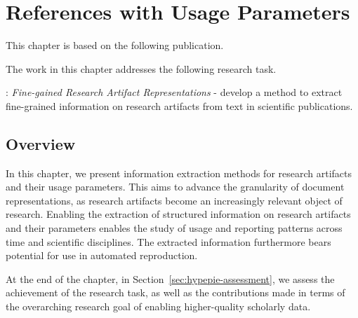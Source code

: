 \chapter{References with Usage Parameters}
\label{chp:params}

This chapter is based on the following publication.
\begin{infobox-pub}
\end{infobox-pub}

The work in this chapter addresses the following research task.

\begin{rtlist}
    \item[\rtmark{4}:] \textit{Fine-gained Research Artifact Representations} - develop a method to extract fine-grained information on research artifacts from text in scientific publications.
\end{rtlist}

\section{Overview}
In this chapter, we present information extraction methods for research artifacts and their usage parameters. This aims to advance the granularity of document representations, as research artifacts become an increasingly relevant object of research. Enabling the extraction of structured information on research artifacts and their parameters enables the study of usage and reporting patterns across time and scientific disciplines. The extracted information furthermore bears potential for use in automated reproduction.

At the end of the chapter, in Section~\ref{sec:hypepie-assessment}, we assess the achievement of the research task, as well as the contributions made in terms of the overarching research goal of enabling higher-quality scholarly data.

